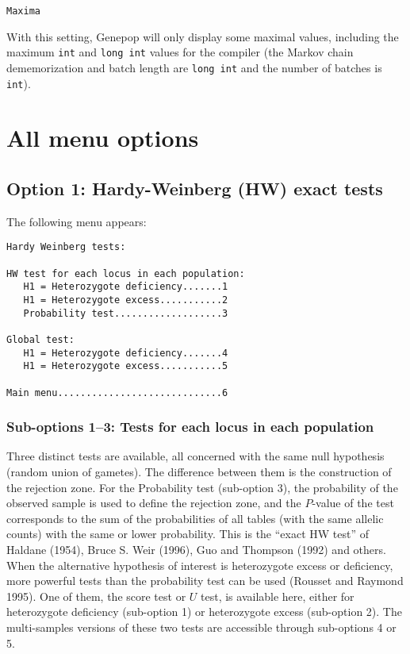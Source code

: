 \documentclass[
  12pt,
]{book}
\begin{document}
\texttt{Maxima}

With this setting, Genepop will only display some maximal values, including the maximum \texttt{int} and \texttt{long\ int} values for the compiler (the Markov chain dememorization and batch length are \texttt{long\ int} and the number of batches is \texttt{int}).

\hypertarget{all-menu-options}{%
\chapter{All menu options}\label{all-menu-options}}

\hypertarget{option-1-hardy-weinberg-hw-exact-tests}{%
\section{Option 1: Hardy-Weinberg (HW) exact tests}\label{option-1-hardy-weinberg-hw-exact-tests}}

The following menu appears:

\begin{verbatim}
Hardy Weinberg tests:

HW test for each locus in each population:
   H1 = Heterozygote deficiency.......1
   H1 = Heterozygote excess...........2
   Probability test...................3

Global test:
   H1 = Heterozygote deficiency.......4
   H1 = Heterozygote excess...........5

Main menu.............................6
\end{verbatim}

\hypertarget{sub-options-13-tests-for-each-locus-in-each-population}{%
\subsection{Sub-options 1--3: Tests for each locus in each population}\label{sub-options-13-tests-for-each-locus-in-each-population}}

Three distinct tests are available, all concerned with the same null hypothesis (random union of gametes). The difference between them is the construction of the rejection zone. For the Probability test (sub-option 3), the probability of the observed sample is used to define the rejection zone, and the \(P\)-value of the test corresponds to the sum of the probabilities of all tables (with the same allelic counts) with the same or lower probability. This is the ``exact HW test'' of Haldane (1954), Bruce S. Weir (1996), Guo and Thompson (1992) and others. When the alternative hypothesis of interest is heterozygote excess or deficiency, more powerful tests than the probability test can be used (Rousset and Raymond 1995). One of them, the score test or \(U\) test, is available here, either for heterozygote deficiency (sub-option 1) or heterozygote excess (sub-option 2). The multi-samples versions of these two tests are accessible through sub-options 4 or 5.
\end{document}
